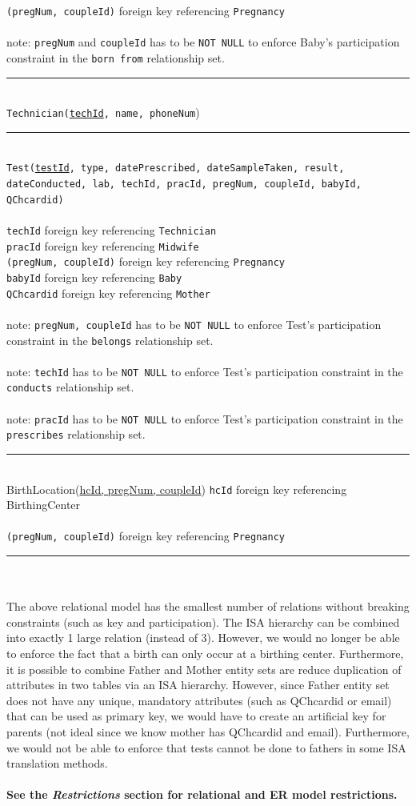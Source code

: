 \documentclass[10pt, letterpaper]{article}
\newcommand{\code}[1]{\texttt{#1}}
\newcommand{\dline}{\par\noindent\rule{\textwidth}{0.2pt}\\}
\begin{document}
\code{(pregNum, coupleId)} foreign key referencing \code{Pregnancy}\\
\\
note: \code{pregNum} and \code{coupleId} has to be \code{NOT NULL} to enforce Baby's participation constraint in the \code{born from} relationship set.
\dline
\code{Technician(\underline{techId}, name, phoneNum})
\dline
\code{Test(\underline{testId}, type, datePrescribed, dateSampleTaken, result, dateConducted, lab, techId, pracId, pregNum, coupleId, babyId, QChcardid)}\\
\\
\code{techId} foreign key referencing \code{Technician}\\
\code{pracId} foreign key referencing \code{Midwife}\\
\code{(pregNum, coupleId)} foreign key referencing \code{Pregnancy}\\
\code{babyId} foreign key referencing \code{Baby}\\
\code{QChcardid} foreign key referencing \code{Mother}\\
\\
note: \code{pregNum, coupleId} has to be \code{NOT NULL} to enforce Test's participation constraint in the \code{belongs} relationship set.\\
\\
note: \code{techId} has to be \code{NOT NULL} to enforce Test's participation constraint in the \code{conducts} relationship set.\\
\\
note: \code{pracId} has to be \code{NOT NULL} to enforce Test's participation constraint in the \code{prescribes} relationship set.
\dline
BirthLocation(\underline{hcId, pregNum, coupleId})
\code{hcId} foreign key referencing BirthingCenter\\
\\
\code{(pregNum, coupleId)} foreign key referencing \code{Pregnancy}
\dline
\\
\noindent The above relational model has the smallest number of relations without breaking constraints (such as key and participation). The ISA hierarchy can be combined into exactly 1 large relation (instead of 3). However, we would no longer be able to enforce the fact that a birth can only occur at a birthing center. Furthermore, it is possible to combine Father and Mother entity sets are reduce duplication of attributes in two tables via an ISA hierarchy. However, since Father entity set does not have any unique, mandatory attributes (such as QChcardid or email) that can be used as primary key, we would have to create an artificial key for parents (not ideal since we know mother has QChcardid and email). Furthermore, we would not be able to enforce that tests cannot be done to fathers in some ISA translation methods. \\
\\
\noindent \textbf{See the \textit{Restrictions} section for relational and ER model restrictions.}
\end{document}
